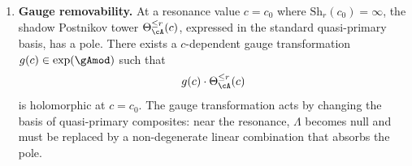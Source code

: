 \begin{theorem}
\begin{enumerate}[label=\textup{(\roman*)}]
  \textup{(}Proposition~\textup{\ref{prop:w-w3-weight6-resonance})}.
\item \textbf{Gauge removability.}
  At a resonance value $c = c_0$ where
  $\mathrm{Sh}_r(c_0) = \infty$, the shadow Postnikov
  tower $\Theta_\cA^{\leq r}(c)$, expressed in the standard
  quasi-primary basis, has a pole.
  There exists a $c$-dependent gauge transformation
  $g(c) \in \exp(\gAmod)$ such that
  \begin{equation}\label{eq:gauge-removability}
  g(c) \cdot \Theta_\cA^{\leq r}(c)
  \end{equation}
  is holomorphic at $c = c_0$.  The gauge transformation acts by
  changing the basis of quasi-primary composites: near the resonance,
  $\Lambda$ becomes null and must be replaced by a non-degenerate
  linear combination that absorbs the pole.
\end{enumerate}
\end{theorem}


